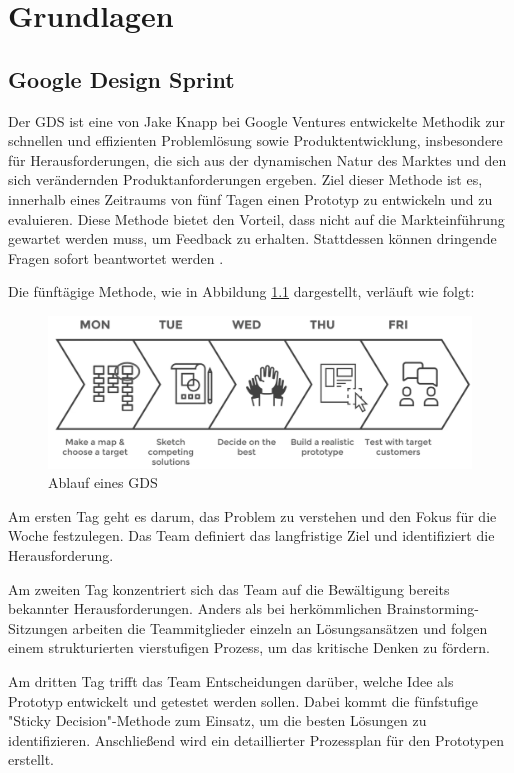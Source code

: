 \chapter{Grundlagen}

\section{Google Design Sprint}

Der \ac{GDS} ist eine von Jake Knapp bei Google Ventures entwickelte Methodik zur schnellen und effizienten Problemlösung sowie Produktentwicklung, insbesondere für Herausforderungen, die sich aus der dynamischen Natur des Marktes und den sich verändernden Produktanforderungen ergeben. 
Ziel dieser Methode ist es, innerhalb eines Zeitraums von fünf Tagen einen Prototyp zu entwickeln und zu evaluieren. 
Diese Methode bietet den Vorteil, dass nicht auf die Markteinführung gewartet werden muss, um Feedback zu erhalten. Stattdessen können dringende Fragen sofort beantwortet werden \cite[S.98 f.]{Design_Sprint}.

Die fünftägige Methode, wie in Abbildung \ref{GDS} dargestellt, verläuft wie folgt:

\begin{figure}[h]
    \centering
    \includegraphics[clip,width=0.75\linewidth]{images/GDS.png}
    \caption[Ablauf eines GDS]{Ablauf eines GDS \cite{GDS_Abbildung}}
    \label{GDS}
\end{figure}

Am ersten Tag geht es darum, das Problem zu verstehen und den Fokus für die Woche festzulegen. Das Team definiert das langfristige Ziel und identifiziert die Herausforderung. 

Am zweiten Tag konzentriert sich das Team auf die Bewältigung bereits bekannter Herausforderungen. Anders als bei herkömmlichen Brainstorming-Sitzungen arbeiten die Teammitglieder einzeln an Lösungsansätzen und folgen einem strukturierten vierstufigen Prozess, um das kritische Denken zu fördern. 

Am dritten Tag trifft das Team Entscheidungen darüber, welche Idee als Prototyp entwickelt und getestet werden sollen. Dabei kommt die fünfstufige "Sticky Decision"-Methode zum Einsatz, um die besten Lösungen zu identifizieren. Anschließend wird ein detaillierter Prozessplan für den Prototypen erstellt. 

